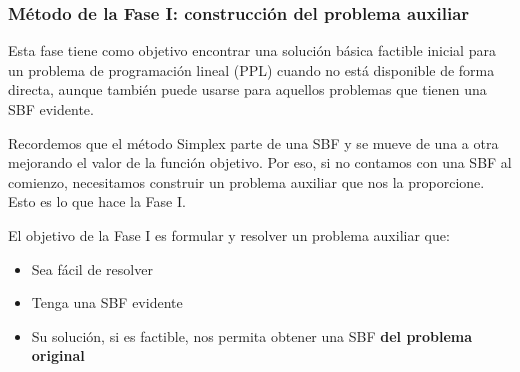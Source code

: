 \subsubsection{Método de la Fase I: construcción del problema auxiliar}

Esta fase tiene como objetivo encontrar una solución básica factible inicial para un problema de programación lineal (PPL) cuando no está disponible de forma directa, aunque también puede usarse para aquellos problemas que tienen una SBF evidente.

Recordemos que el método Simplex parte de una SBF y se mueve de una a otra mejorando el valor de la función objetivo. Por eso, si no contamos con una SBF al comienzo, necesitamos construir un problema auxiliar que nos la proporcione. Esto es lo que hace la Fase I.

El objetivo de la Fase I es formular y resolver un problema auxiliar que:
\begin{itemize}
  \item Sea fácil de resolver
  \item Tenga una SBF evidente
  \item Su solución, si es factible, nos permita obtener una SBF \textbf{del problema original}
\end{itemize}


